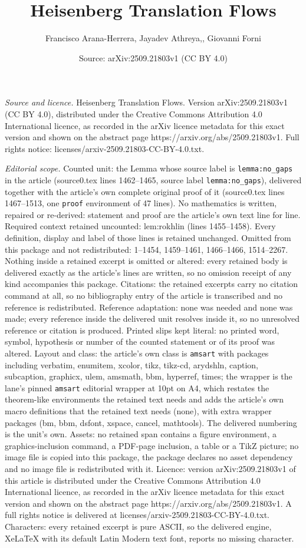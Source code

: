 \documentclass[10pt,a4paper]{amsart}
\title[Heisenberg Translation Flows]{Heisenberg Translation Flows}
\author{Francisco Arana-Herrera, Jayadev Athreya,, Giovanni Forni}
\date{Source: arXiv:2509.21803v1 (CC BY 4.0)}
\begin{document}
\maketitle

\noindent\emph{Source and licence.} Heisenberg Translation Flows. Version arXiv:2509.21803v1 (CC BY 4.0), distributed under the Creative Commons Attribution 4.0 International licence, as recorded in the arXiv licence metadata for this exact version and shown on the abstract page https://arxiv.org/abs/2509.21803v1. Full rights notice: licenses/arxiv-2509.21803-CC-BY-4.0.txt.\par\smallskip

\noindent\textit{Editorial scope.} Counted unit: the Lemma whose source label is \texttt{lemma:no\_gaps} in the article (source0.tex lines 1462--1465, source label \texttt{lemma:no\_gaps}), delivered together with the article's own complete original proof of it (source0.tex lines 1467--1513, one \texttt{proof} environment of 47 lines). No mathematics is written, repaired or re-derived: statement and proof are the article's own text line for line. Required context retained uncounted: lem:rokhlin (lines 1455--1458). Every definition, display and label of those lines is retained unchanged. Omitted from this package and not redistributed: 1--1454, 1459--1461, 1466--1466, 1514--2267. Nothing inside a retained excerpt is omitted or altered: every retained body is delivered exactly as the article's lines are written, so no omission receipt of any kind accompanies this package. Citations: the retained excerpts carry no citation command at all, so no bibliography entry of the article is transcribed and no reference is redistributed. Reference adaptation: none was needed and none was made; every reference inside the delivered unit resolves inside it, so no unresolved reference or citation is produced. Printed slips kept literal: no printed word, symbol, hypothesis or number of the counted statement or of its proof was altered. Layout and class: the article's own class is \texttt{amsart} with packages including verbatim, enumitem, xcolor, tikz, tikz-cd, arydshln, caption, subcaption, graphicx, ulem, amsmath, bbm, hyperref, times; the wrapper is the lane's pinned \texttt{amsart} editorial wrapper at 10pt on A4, which restates the theorem-like environments the retained text needs and adds the article's own macro definitions that the retained text needs (none), with extra wrapper packages (bm, bbm, dsfont, xspace, cancel, mathtools). The delivered numbering is the unit's own. Assets: no retained span contains a figure environment, a graphics-inclusion command, a PDF-page inclusion, a table or a TikZ picture; no image file is copied into this package, the package declares no asset dependency and no image file is redistributed with it. Licence: version arXiv:2509.21803v1 of this article is distributed under the Creative Commons Attribution 4.0 International licence, as recorded in the arXiv licence metadata for this exact version and shown on the abstract page https://arxiv.org/abs/2509.21803v1. A full rights notice is delivered at licenses/arxiv-2509.21803-CC-BY-4.0.txt. Characters: every retained excerpt is pure ASCII, so the delivered engine, XeLaTeX with its default Latin Modern text font, reports no missing character.
\end{document}
